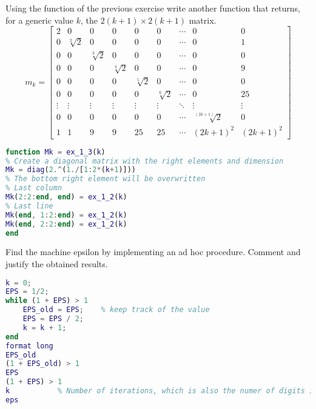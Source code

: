 \documentclass[12pt, a4paper]{report}
\newtheorem[style=M,bodystyle=\normalfont]{theorem}{Theorem}
\newtheorem[style=M,bodystyle=\normalfont]{corollary}{Corollary}
\newtheorem[style=M,bodystyle=\normalfont]{lemma}{Lemma}
\newtheorem[style=M,bodystyle=\normalfont]{definition}{Definition}
\begin{document}
    \begin{Exercise}[label=3]
        Using the function of the previous exercise write another function that returns, for a generic value $k$, the $2(k + 1) \times 2(k + 1)$ matrix.
        \[
            m_k=
            \begin{bmatrix}
                2 & 0 & 0 & 0 & 0 & 0 & \cdots & 0 & 0 \\
                0 & \sqrt[2]{2} & 0 & 0 & 0 & 0 & \cdots & 0 & 1 \\
                0 & 0 & \sqrt[3]{2} & 0 & 0 & 0 & \cdots & 0 & 0 \\
                0 & 0 & 0 & \sqrt[4]{2} & 0 & 0 & \cdots & 0 & 9 \\
                0 & 0 & 0 & 0 & \sqrt[5]{2} & 0 & \cdots & 0 & 0 \\
                0 & 0 & 0 & 0 & 0 & \sqrt[6]{2} & \cdots & 0 & 25 \\
                \vdots  & \vdots  & \vdots  & \vdots  & \vdots  & \vdots  & \ddots & \vdots  & \vdots  \\
                0 & 0 & 0 & 0 & 0 & 0 & \cdots & \sqrt[(2k+1)]{2} & 0 \\
                1 & 1 & 9 & 9 & 25 & 25 & \cdots & (2k+1)^2 & (2k+1)^2 
            \end{bmatrix} 
        \]
    \end{Exercise}
    \begin{Answer}[ref=3]
        \begin{lstlisting}[language=Matlab]
function Mk = ex_1_3(k)
% Create a diagonal matrix with the right elements and dimension
Mk = diag(2.^(1./[1:2*(k+1)]))
% The bottom right element will be overwritten
% Last column
Mk(2:2:end, end) = ex_1_2(k)
% Last line
Mk(end, 1:2:end) = ex_1_2(k)
Mk(end, 2:2:end) = ex_1_2(k)
end
        \end{lstlisting}
    \end{Answer}

    \newpage

    \begin{Exercise}[label=4]
        Find the machine epsilon by implementing an ad hoc procedure. Comment and justify the obtained results.
    \end{Exercise}
    \begin{Answer}[ref=4]
        \begin{lstlisting}[language=Matlab]
k = 0;
EPS = 1/2;
while (1 + EPS) > 1
    EPS_old = EPS;    % keep track of the value
    EPS = EPS / 2;
    k = k + 1;
end
format long
EPS_old		
(1 + EPS_old) > 1
EPS
(1 + EPS) > 1
k			% Number of iterations, which is also the numer of digits in the mantissa, according to the standard
eps			 
        \end{lstlisting}
    \end{Answer}
\end{document}
